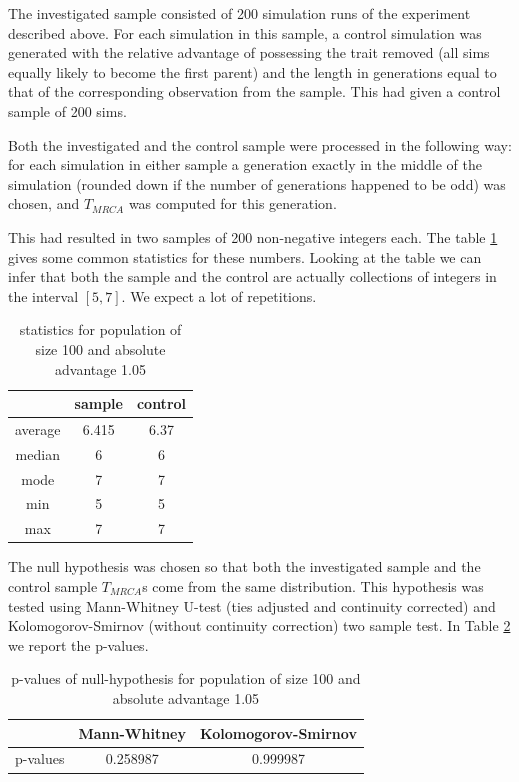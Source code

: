\documentclass{l4proj}
\begin{document}
The investigated sample consisted of 200 simulation runs of the experiment described above. For each simulation in this sample, a control simulation was generated with the relative advantage of possessing the trait removed (all sims equally likely to become the first parent) and the length in generations equal to that of the corresponding observation from the sample. This had given a control sample of 200 sims.

Both the investigated and the control sample were processed in the following way: for each simulation in either sample a generation exactly in the middle of the simulation (rounded down if the number of generations happened to be odd) was chosen, and $T_{MRCA}$ was computed for this generation.

This had resulted in two samples of 200 non-negative integers each. The table \ref{populationTable} gives some common statistics for these numbers. Looking at the table we can infer that both the sample and the control are actually collections of integers in the interval $[5, 7]$. We expect a lot of repetitions.

\begin{table}[]
    \centering
    \begin{tabular}{|c|c|c|}
    \hline
     & sample & control \\ \hline\hline
     average & 6.415 & 6.37 \\ \hline
     median & 6 & 6 \\ \hline
     mode & 7 & 7 \\ \hline
     min & 5 & 5 \\ \hline
     max & 7 & 7 \\ \hline
    \end{tabular}
    \caption{statistics for population of size 100 and absolute advantage 1.05}
    \label{populationTable}
\end{table}

The null hypothesis was chosen so that both the investigated sample and the control sample $T_{MRCA}$s come from the same distribution. This hypothesis was tested using Mann-Whitney U-test (ties adjusted and continuity corrected) and Kolomogorov-Smirnov (without continuity correction) two sample test. In Table \ref{nullHypothesisTable} we report the p-values.

\begin{table}[]
    \centering
    \begin{tabular}{|c|c|c|}
    \hline
    & Mann-Whitney & Kolomogorov-Smirnov \\ \hline
    p-values & 0.258987 & 0.999987 \\ \hline
    \end{tabular}
    \caption{p-values of null-hypothesis for population of size 100 and absolute advantage 1.05}
    \label{nullHypothesisTable}
\end{table}
\end{document}
